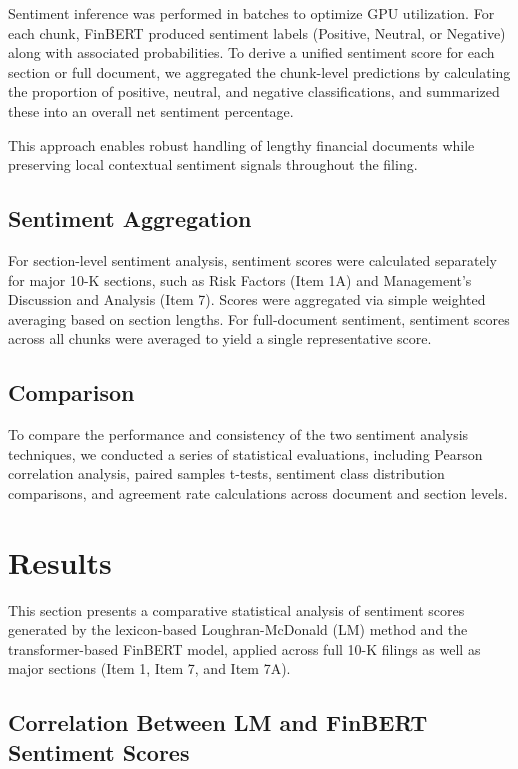 \documentclass[12pt]{article}
\begin{document}
Sentiment inference was performed in batches to optimize GPU utilization. For each chunk, FinBERT produced sentiment labels (Positive, Neutral, or Negative) along with associated probabilities. To derive a unified sentiment score for each section or full document, we aggregated the chunk-level predictions by calculating the proportion of positive, neutral, and negative classifications, and summarized these into an overall net sentiment percentage. 

This approach enables robust handling of lengthy financial documents while preserving local contextual sentiment signals throughout the filing.

\subsection{Sentiment Aggregation}
For section-level sentiment analysis, sentiment scores were calculated separately for major 10-K sections, such as Risk Factors (Item 1A) and Management’s Discussion and Analysis (Item 7). Scores were aggregated via simple weighted averaging based on section lengths. For full-document sentiment, sentiment scores across all chunks were averaged to yield a single representative score.

\subsection{Comparison}
To compare the performance and consistency of the two sentiment analysis techniques, we conducted a series of statistical evaluations, including Pearson correlation analysis, paired samples t-tests, sentiment class distribution comparisons, and agreement rate calculations across document and section levels.

\section{Results}

This section presents a comparative statistical analysis of sentiment scores generated by the lexicon-based Loughran-McDonald (LM) method and the transformer-based FinBERT model, applied across full 10-K filings as well as major sections (Item 1, Item 7, and Item 7A).

\subsection{Correlation Between LM and FinBERT Sentiment Scores}
\end{document}
